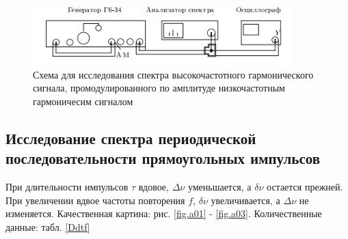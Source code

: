 \documentclass{article}
\begin{document}
   \begin{figure}[h]
   \centering
   \includegraphics[width=10cm]{3_6_1c.jpg} 
   \caption{Схема для исследования спектра высокочастотного гармонического сигнала, промодулированного по амплитуде низкочастотным гармоничесим сигналом} 
   \label{fig.3} 
   \end{figure}

   \subsection*{Исследование спектра периодической последовательности прямоугольных импульсов}
   При длительности импульсов $\tau$ вдовое, $\Delta \nu$ уменьшается, а $\delta \nu$ остается прежней. При увеличении вдвое частоты повторения $f$, $\delta \nu$ увеличивается, а $\Delta \nu$ не изменяется. Качественная картина: рис. \ref{fig.a01} - \ref{fig.a03}. Количественные данные: табл. \ref{Ddtf}
\end{document}
